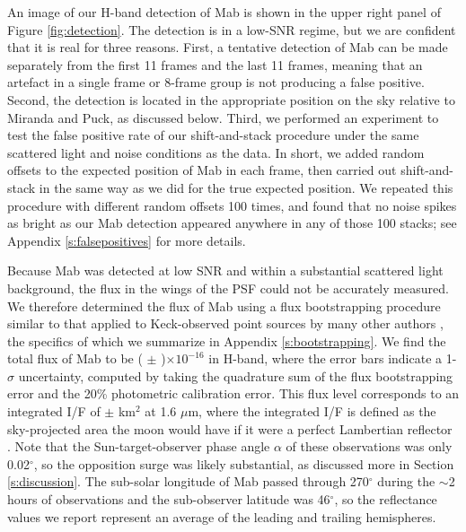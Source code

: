 \documentclass[preprint]{aastex631}
\begin{document}
An image of our H-band detection of Mab is shown in the upper right panel of Figure \ref{fig:detection}. The detection is in a low-SNR regime, but we are confident that it is real for three reasons. First, a tentative detection of Mab can be made separately from the first 11 frames and the last 11 frames, meaning that an artefact in a single frame or 8-frame group is not producing a false positive. Second, the detection is located in the appropriate position on the sky relative to Miranda and Puck, as discussed below. Third, we performed an experiment to test the false positive rate of our shift-and-stack procedure under the same scattered light and noise conditions as the data. In short, we added random offsets to the expected position of Mab in each frame, then carried out shift-and-stack in the same way as we did for the true expected position. We repeated this procedure with different random offsets 100 times, and found that no noise spikes as bright as our Mab detection appeared anywhere in any of those 100 stacks; see Appendix \ref{s:falsepositives} for more details.

Because Mab was detected at low SNR and within a substantial scattered light background, the flux in the wings of the PSF could not be accurately measured. We therefore determined the flux of Mab using a flux bootstrapping procedure similar to that applied to Keck-observed point sources by many other authors \citep[e.g.,][]{gibbard05, molter19, paradis23}, the specifics of which we summarize in Appendix \ref{s:bootstrapping}. We find the total flux of Mab to be
( $\pm$ )$\times10^{-16}$ \ergsec{} 
in H-band, where the error bars indicate a 1-$\sigma$ uncertainty, computed by taking the quadrature sum of the flux bootstrapping error and the 20\% photometric calibration error. This flux level corresponds to an integrated I/F of 
 $\pm$  km$^{2}$ 
at 1.6 $\mu$m, where the integrated I/F is defined as the sky-projected area the moon would have if it were a perfect Lambertian reflector \citep[i.e., a geometric albedo of unity;][]{karkoschka01}. Note that the Sun-target-observer phase angle $\alpha$ of these observations was only 0.02$^\circ$, so the opposition surge was likely substantial, as discussed more in Section \ref{s:discussion}. The sub-solar longitude of Mab passed through 270$^\circ$ during the $\sim$2 hours of observations and the sub-observer latitude was 46$^\circ$, so the reflectance values we report represent an average of the leading and trailing hemispheres.
\end{document}
